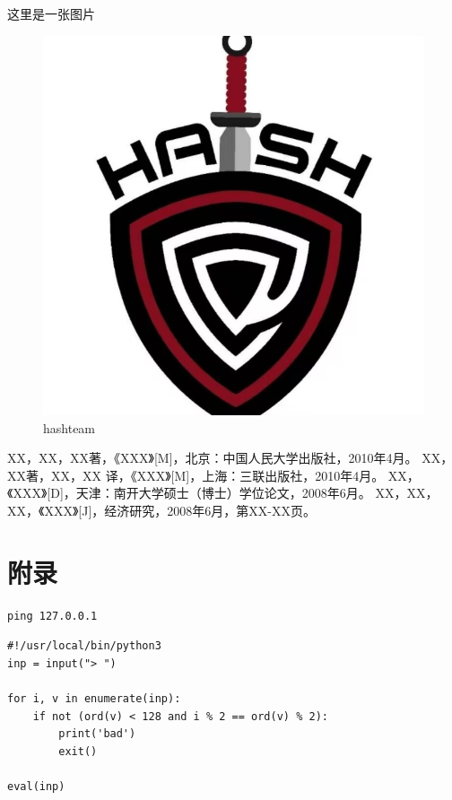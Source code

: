 \documentclass[a4paper,12pt]{ctexart} %
\begin{document}
这里是一张图片
\begin{figure}[H]
    \centering
    \includegraphics[width=0.5\linewidth]{images/HASHTEAM.jpg}
    \caption{hashteam}
    \label{fig:enter-label}
\end{figure}



\clearpage
\begin{thebibliography}{99} %


 XX，XX，XX著，《XXX》[M]，北京：中国人民大学出版社，2010年4月。
 XX，XX著，XX，XX 译，《XXX》[M]，上海：三联出版社，2010年4月。
 XX，《XXX》[D]，天津：南开大学硕士（博士）学位论文，2008年6月。
 XX，XX，XX，《XXX》[J]，经济研究，2008年6月，第XX-XX页。

\end{thebibliography}
\clearpage
\section*{附录}


\lstset{language=sh}
\begin{lstlisting}
ping 127.0.0.1
\end{lstlisting}

\lstset{language=Python}
\begin{lstlisting}
#!/usr/local/bin/python3
inp = input("> ")

for i, v in enumerate(inp):
    if not (ord(v) < 128 and i % 2 == ord(v) % 2):
        print('bad')
        exit()

eval(inp)
\end{lstlisting}
\end{document}

